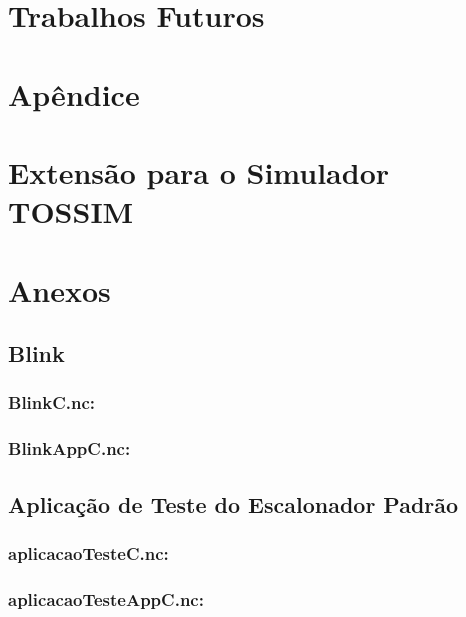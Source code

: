 \documentclass[a4paper, 10pt]{article}
\begin{document}

\section{Trabalhos Futuros}


\section{Apêndice}
\appendix
\section{Extensão para o Simulador TOSSIM}
\label{a:escalonador-tossim}
\section{Anexos}
\subsection{Blink}\label{a:Blink}
    \subsubsection{BlinkC.nc:}
    

    \subsubsection{BlinkAppC.nc:}
    

\subsection{Aplicação de Teste do Escalonador Padrão}\label{a:appTestePadrao}
    \subsubsection{aplicacaoTesteC.nc:}
    

    \subsubsection{aplicacaoTesteAppC.nc:}
    
\end{document}
